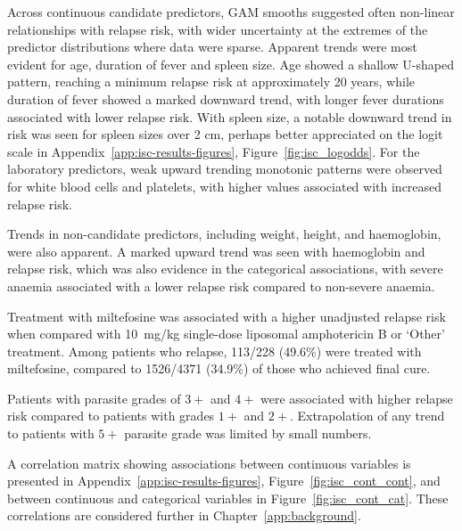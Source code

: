 Across continuous candidate predictors, GAM smooths suggested often non-linear relationships with relapse risk, with wider uncertainty at the extremes of the predictor distributions where data were sparse. Apparent trends were most evident for age, duration of fever and spleen size. Age showed a shallow U-shaped pattern, reaching a minimum relapse risk at approximately 20 years, while duration of fever showed a marked downward trend, with longer fever durations associated with lower relapse risk. With spleen size, a notable downward trend in risk was seen for spleen sizes over 2 cm, perhaps better appreciated on the logit scale in Appendix~\ref{app:isc-results-figures}, Figure~\ref{fig:isc_logodds}. For the laboratory predictors, weak upward trending monotonic patterns were observed for white blood cells and platelets, with higher values associated with increased relapse risk.

Trends in non-candidate predictors, including weight, height, and haemoglobin, were also apparent. A marked upward trend was seen with haemoglobin and relapse risk, which was also evidence in the categorical associations, with severe anaemia associated with a lower relapse risk compared to non-severe anaemia.

Treatment with miltefosine was associated with a higher unadjusted relapse risk when compared with 10~mg/kg single-dose liposomal amphotericin B or `Other' treatment. Among patients who relapse, 113/228 (49.6\%) were treated with miltefosine, compared to 1526/4371 (34.9\%) of those who achieved final cure.

Patients with parasite grades of $3+$ and $4+$ were associated with higher relapse risk compared to patients with grades $1+$ and $2+$. Extrapolation of any trend to patients with $5+$ parasite grade was limited by small numbers.

A correlation matrix showing associations between continuous variables is presented in Appendix~\ref{app:isc-results-figures}, Figure~\ref{fig:isc_cont_cont}, and between continuous and categorical variables in Figure~\ref{fig:isc_cont_cat}. These correlations are considered further in Chapter~\ref{app:background}.


